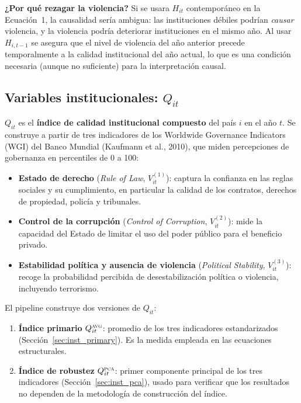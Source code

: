 \documentclass[12pt, a4paper]{article}
\theoremstyle{definition}
\begin{document}
\begin{intuitionbox}
\textbf{¿Por qué rezagar la violencia?} Si se usara $H_{it}$ contemporáneo en la Ecuación~1, la causalidad sería ambigua: las instituciones débiles podrían \emph{causar} violencia, y la violencia podría deteriorar instituciones en el mismo año. Al usar $H_{i,t-1}$ se asegura que el nivel de violencia del año anterior precede temporalmente a la calidad institucional del año actual, lo que es una condición necesaria (aunque no suficiente) para la interpretación causal.
\end{intuitionbox}

\subsection{Variables institucionales: $Q_{it}$}

$Q_{it}$ es el \textbf{índice de calidad institucional compuesto} del país $i$ en el año $t$. Se construye a partir de tres indicadores de los Worldwide Governance Indicators (WGI) del Banco Mundial (Kaufmann et al., 2010), que miden percepciones de gobernanza en percentiles de 0 a 100:

\begin{itemize}
  \item \textbf{Estado de derecho} (\textit{Rule of Law}, $V^{(1)}_{it}$): captura la confianza en las reglas sociales y su cumplimiento, en particular la calidad de los contratos, derechos de propiedad, policía y tribunales.
  \item \textbf{Control de la corrupción} (\textit{Control of Corruption}, $V^{(2)}_{it}$): mide la capacidad del Estado de limitar el uso del poder público para el beneficio privado.
  \item \textbf{Estabilidad política y ausencia de violencia} (\textit{Political Stability}, $V^{(3)}_{it}$): recoge la probabilidad percibida de desestabilización política o violencia, incluyendo terrorismo.
\end{itemize}

El pipeline construye dos versiones de $Q_{it}$:
\begin{enumerate}
  \item \textbf{Índice primario} $Q^{\textsc{avg}}_{it}$: promedio de los tres indicadores estandarizados (Sección~\ref{sec:inst_primary}). Es la medida empleada en las ecuaciones estructurales.
  \item \textbf{Índice de robustez} $Q^{\textsc{pca}}_{it}$: primer componente principal de los tres indicadores (Sección~\ref{sec:inst_pca}), usado para verificar que los resultados no dependen de la metodología de construcción del índice.
\end{enumerate}
\end{document}
